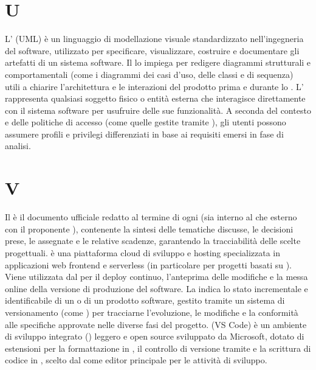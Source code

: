 \section{U}
L' (UML) è un linguaggio di modellazione visuale standardizzato nell'ingegneria del software, utilizzato per specificare, visualizzare, costruire e documentare gli artefatti di un sistema software. Il  lo impiega per redigere diagrammi strutturali e comportamentali (come i diagrammi dei casi d'uso, delle classi e di sequenza) utili a chiarire l'architettura e le interazioni del prodotto prima e durante lo .
L' rappresenta qualsiasi soggetto fisico o entità esterna che interagisce direttamente con il sistema software per usufruire delle sue funzionalità. A seconda del contesto e delle politiche di accesso (come quelle gestite tramite ), gli utenti possono assumere profili e privilegi differenziati in base ai requisiti emersi in fase di analisi.
\section{V}
Il  è il documento ufficiale redatto al termine di ogni  (sia interno al  che esterno con il proponente ), contenente la sintesi delle tematiche discusse, le decisioni prese, le  assegnate e le relative scadenze, garantendo la tracciabilità delle scelte progettuali.
 è una piattaforma cloud di sviluppo e hosting specializzata in applicazioni web frontend e serverless (in particolare per progetti basati su ). Viene utilizzata dal  per il deploy continuo, l'anteprima delle modifiche e la messa online della versione di produzione del software.
La  indica lo stato incrementale e identificabile di un  o di un prodotto software, gestito tramite un sistema di versionamento (come ) per tracciarne l'evoluzione, le modifiche e la conformità alle specifiche approvate nelle diverse fasi del progetto.
 (VS Code) è un ambiente di sviluppo integrato () leggero e open source sviluppato da Microsoft, dotato di estensioni per la formattazione in , il controllo di versione tramite  e la scrittura di codice in , scelto dal  come editor principale per le attività di sviluppo.
